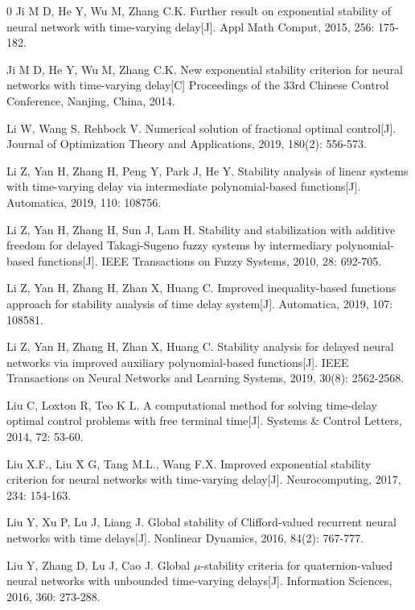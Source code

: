 \documentclass[a4paper, 12pt, oneside]{article}
\theoremstyle{cn_theorem}
\begin{document}
{\begin{thebibliography}{0}
 Ji M D, He Y, Wu M, Zhang C.K. Further result on exponential stability of neural network with time-varying delay[J]. Appl Math Comput, 2015, 256: 175-182.

 Ji M D, He Y, Wu M, Zhang C.K. New exponential stability criterion for neural networks with time-varying delay[C] Proceedings of the 33rd Chinese Control Conference, Nanjing, China, 2014.

 Li W, Wang S, Rehbock V. Numerical solution of fractional optimal control[J]. Journal of Optimization Theory and Applications, 2019, 180(2): 556-573.

 Li Z, Yan H, Zhang H, Peng Y, Park J, He Y. Stability analysis of linear systems with time-varying delay via intermediate polynomial-based functions[J]. Automatica, 2019, 110: 108756.

 Li Z, Yan H, Zhang H, Sun J, Lam H. Stability and stabilization with additive freedom for delayed Takagi-Sugeno fuzzy systems by intermediary polynomial-based functions[J]. IEEE Transactions on Fuzzy Systems, 2010, 28: 692-705.

 Li Z, Yan H, Zhang H, Zhan X, Huang C. Improved inequality-based functions approach for stability analysis of time delay system[J]. Automatica, 2019, 107: 108581.

 Li Z, Yan H, Zhang H, Zhan X, Huang C. Stability analysis for delayed neural networks via improved auxiliary polynomial-based functions[J]. IEEE Transactions on Neural Networks and Learning Systems, 2019, 30(8): 2562-2568.

 Liu C, Loxton R, Teo K L. A computational method for solving time-delay optimal control problems with free terminal time[J]. Systems \& Control Letters, 2014, 72: 53-60.

 Liu X.F., Liu X G, Tang M.L., Wang F.X. Improved exponential stability criterion for neural networks with time-varying delay[J]. Neurocomputing, 2017, 234: 154-163.

 Liu Y, Xu P, Lu J, Liang J. Global stability of Clifford-valued recurrent neural networks with time delays[J]. Nonlinear Dynamics, 2016, 84(2): 767-777.

 Liu Y, Zhang D, Lu J, Cao J. Global $\mu$-stability criteria for quaternion-valued neural networks with unbounded time-varying delays[J]. Information Sciences, 2016, 360: 273-288.


\end{thebibliography}}
\end{document}
